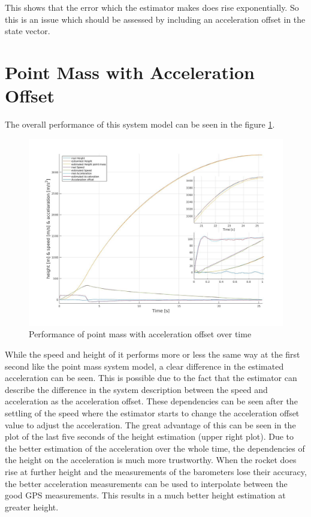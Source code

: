 This shows that the error which the estimator makes does rise exponentially.
So this is an issue which should be assessed by including an acceleration offset in the state vector.


\section{Point Mass with Acceleration Offset}
The overall performance of this system model can be seen in the figure \ref{fig:PointMassOffsetPerformance}.

\begin{figure}[h!]
 \centering
 \includegraphics[width=.8 \textwidth]{./Pictures/PointMassOffsetPerformance.jpg}
 \caption{Performance of point mass with acceleration offset over time}
 \label{fig:PointMassOffsetPerformance}
\end{figure}

While the speed and height of it performs more or less the same way at the first second like the point mass system model,
a clear difference in the estimated acceleration can be seen.
This is possible due to the fact that the estimator can describe the difference in the system description between the speed and acceleration as the acceleration offset.
These dependencies can be seen after the settling of the speed where the estimator starts to change the acceleration offset value to adjust the acceleration.
The great advantage of this can be seen in the plot of the last five seconds of the height estimation (upper right plot).
Due to the better estimation of the acceleration over the whole time, the dependencies of the height on the acceleration is much more trustworthy.
When the rocket does rise at further height and the measurements of the barometers lose their accuracy,
the better acceleration measurements can be used to interpolate between the good GPS measurements.
This results in a much better height estimation at greater height.

